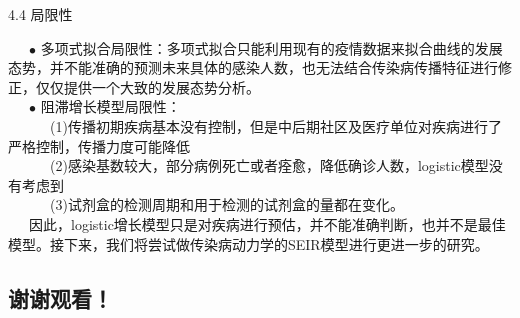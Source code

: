 \documentclass[
  ignorenonframetext,
]{beamer}
\begin{document}
\begin{frame}{4.4 局限性}
\protect\hypertarget{section-40}{}

  \(\bullet\)
多项式拟合局限性：多项式拟合只能利用现有的疫情数据来拟合曲线的发展态势，并不能准确的预测未来具体的感染人数，也无法结合传染病传播特征进行修正，仅仅提供一个大致的发展态势分析。\\
  \(\bullet\) 阻滞增长模型局限性：\\
    (1)传播初期疾病基本没有控制，但是中后期社区及医疗单位对疾病进行了严格控制，传播力度可能降低\\
    (2)感染基数较大，部分病例死亡或者痊愈，降低确诊人数，logistic模型没有考虑到\\
    (3)试剂盒的检测周期和用于检测的试剂盒的量都在变化。\\
  因此，logistic增长模型只是对疾病进行预估，并不能准确判断，也并不是最佳模型。接下来，我们将尝试做传染病动力学的SEIR模型进行更进一步的研究。

\end{frame}

\hypertarget{section-41}{%
\subsection{\texorpdfstring{\textbf{谢谢观看！}}{谢谢观看！}}\label{section-41}}
\end{document}

